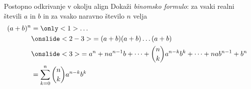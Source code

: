 \begin{frame}{Postopno odkrivanje v okolju align}
	Dokaži \emph{binomsko formulo}: za vsaki realni števili \(a\) in \(b\) in za vsako naravno število \(n\) velja
	\begin{align*}
	(a+b)^n &= \only<1>{\ldots} \\
	&\onslide<2-3>{= (a+b) (a+b) \dots (a+b)} \\
	&\onslide<3>{= a^n + n a^{n-1} b + \dots + \binom{n}{k} a^{n-k} b^k + \dots + n a b^{n-1} + b^n} \\
	&= \sum_{k=0}^n \binom{n}{k} a^{n-k} b^k
	\end{align*}
\end{frame}
